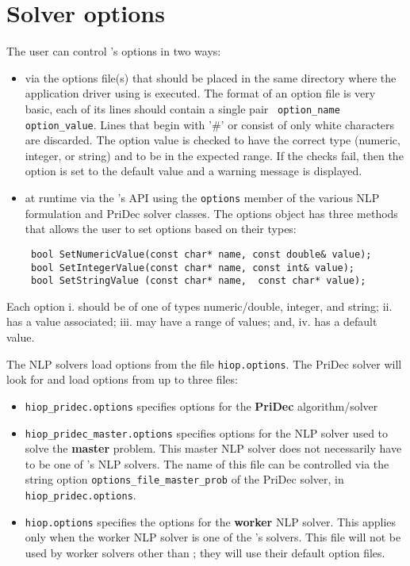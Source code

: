 \section{Solver options}
The user can control \Hi's options in two ways:
\begin{itemize}
\item via the options file(s) that should be placed in the same directory where the application driver using \Hi is executed. The format of an option file is very basic, each of its lines should contain a single pair \texttt{ option\_name option\_value}. Lines that begin with '\#' or consist of only white characters are discarded. The option value is checked to have the correct type (numeric, integer, or string) and to be in the expected range. If the checks fail, then the option is set to the default value and a warning message is displayed.
\item at runtime via the \Hi's API using the \texttt{options} member of the various NLP formulation and PriDec solver classes. The options object has three methods that allows the user to set options based on their types:
\begin{lstlisting}
 bool SetNumericValue(const char* name, const double& value);
 bool SetIntegerValue(const char* name, const int& value);
 bool SetStringValue (const char* name,  const char* value);
\end{lstlisting}
\end{itemize}

\warningcp{} Each option i. should be of one of types numeric/double, integer, and string; ii. has a value associated; iii. may have a range of values;  and, iv. has a default value. 

The NLP solvers load options from the file \texttt{hiop.options}. The PriDec solver will look for and load options from up to three files:
\begin{itemize}
\item \texttt{hiop\_pridec.options} specifies options for the \textbf{PriDec} algorithm/solver
\item \texttt{hiop\_pridec\_master.options} specifies options for the NLP solver used to solve the \textbf{master} problem. This master NLP solver does not necessarily have to be one of \Hi's NLP solvers. The name of this file can be controlled via the string option \texttt{options\_file\_master\_prob} of the PriDec solver, in \texttt{hiop\_pridec.options}.
\item \texttt{hiop.options} specifies the options for the \textbf{worker} NLP solver. This applies only when the worker NLP solver is one of the \Hi's solvers. This file will not be used by worker solvers other than \Hi; they will use their default option files.
\end{itemize}

